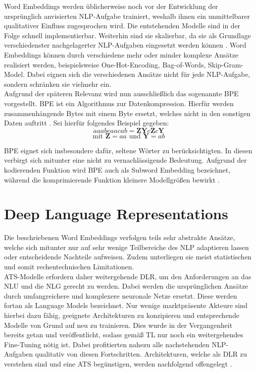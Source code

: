 \noindent
Word Embeddings werden üblicherweise noch vor der Entwicklung der ursprünglich anvisierten \ac{NLP}-Aufgabe trainiert, weshalb ihnen ein unmittelbarer qualitativer Einfluss zugesprochen wird. Die entstehenden Modelle sind in der Folge schnell implementierbar. Weiterhin sind sie skalierbar, da sie als Grundlage verschiedenster nachgelagerter \ac{NLP}-Aufgaben eingesetzt werden können \cite{NIT19}. Word Embeddings können durch verschiedene mehr oder minder komplexe Ansätze realisiert werden, beispielsweise One-Hot-Encoding, Bag-of-Words, Skip-Gram-Model. Dabei eignen sich die verschiedenen Ansätze nicht für jede \ac{NLP}-Aufgabe, sondern schränken sie vielmehr ein.\\

\noindent
Aufgrund der späteren Relevanz wird nun ausschließlich das sogenannte \ac{BPE} vorgestellt. \ac{BPE} ist ein Algorithmus zur Datenkompression. Hierfür werden zusammenhängende Bytes mit einem Byte ersetzt, welches nicht in den sonstigen Daten auftritt \cite[S.~24]{NIT19}. Sei hierfür folgendes Beispiel gegeben: $$aaabcaacab = \boldsymbol{Z}\boldsymbol{Y}c\boldsymbol{Z}c\boldsymbol{Y}$$ $$\text{mit } \boldsymbol{Z} = aa \text{ und } \boldsymbol{Y} = ab$$
\newpage

\noindent
\ac{BPE} eignet sich insbesondere dafür, seltene Wörter zu berücksichtigten. In diesen verbirgt sich mitunter eine nicht zu vernachlässigende Bedeutung. Aufgrund der kodierenden Funktion wird \ac{BPE} auch als Subword Embedding bezeichnet, während die komprimierende Funktion kleinere Modellgrößen bewirkt \cite[S.~24]{NIT19}.


\section{Deep Language Representations}
\noindent
Die beschriebenen Word Embeddings verfolgen teils sehr abstrakte Ansätze, welche sich mitunter nur auf sehr wenige Teilbereiche des \ac{NLP} adaptieren lassen oder entscheidende Nachteile aufweisen. Zudem unterliegen sie meist statistischen und somit rechentechnischen Limitationen.\\

\noindent
\ac{ATS}-Modelle erfordern daher weitergehende \ac{DLR}, um den Anforderungen an das \ac{NLU} und die \ac{NLG} gerecht zu werden. Dabei werden die ursprünglichen Ansätze durch umfangreichere und komplexere neuronale Netze ersetzt. Diese werden fortan als Language Models bezeichnet. Nur wenige marktpräsente Akteure sind hierbei dazu fähig, geeignete Architekturen zu konzipieren und entsprechende Modelle von Grund auf neu zu trainieren. Dies wurde in der Vergangenheit bereits getan und veröffentlicht, sodass gemäß \ac{TL} nur noch ein weitergehendes Fine-Tuning nötig ist. Dabei profitierten nahezu alle nachstehenden \ac{NLP}-Aufgaben qualitativ von diesen Fortschritten. Architekturen, welche als \ac{DLR} zu verstehen sind und eine \ac{ATS} begünstigen, werden nachfolgend offengelegt \cite[S.~25]{NIT19}.



